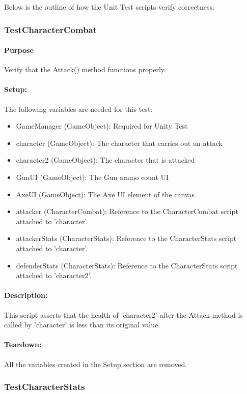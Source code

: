 \documentclass[12pt, titlepage]{article}
\begin{document}
{\color{magenta}
Below is the outline of how the Unit Test scripts verify correctness: \newline

\subsubsection{Test\textunderscore CharacterCombat}

\paragraph{Purpose} Verify that the Attack() method functions properly.

\paragraph{Setup: } The following variables are needed for this test:
\begin{itemize}
	\item GameManager (GameObject): Required for Unity Test
	\item  character (GameObject): The character that carries out an attack
	\item  character2 (GameObject):
	The character that is attacked
	\item  GunUI (GameObject): The Gun ammo count UI
	\item AxeUI (GameObject): The Axe UI element of the canvas
	\item attacker (CharacterCombat): Reference to the CharacterCombat script attached to 'character'.
	\item attackerStats (CharacterStats): Reference to the CharacterStats script attached to 'character'.
	\item defenderStats (CharacterStats): Reference to the CharacterStats script attached to 'character2'.
\end{itemize}
\paragraph{Description: }
	This script asserts that the health of 'character2' after the Attack method is called by 'character' is less than its original value.
\paragraph{Teardown: } All the variables created in the Setup section are removed.
\subsubsection{Test\textunderscore CharacterStats}

}
\end{document}
